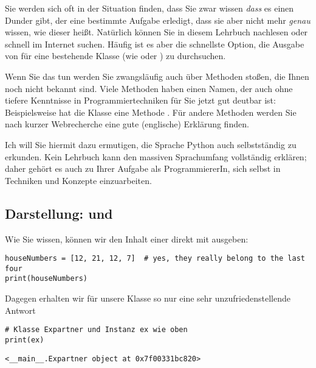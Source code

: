 \begin{hintbox}
Sie werden sich oft in der Situation finden, dass Sie zwar wissen \emph{dass} es einen Dunder gibt, der eine bestimmte Aufgabe erledigt, dass sie aber nicht mehr \emph{genau} wissen, wie dieser heißt. Natürlich können Sie in diesem Lehrbuch nachlesen oder schnell im Internet suchen. Häufig ist es aber die schnellste Option, die Ausgabe von  für eine bestehende Klasse (wie  oder ) zu durchsuchen.

Wenn Sie das tun werden Sie zwangsläufig auch über Methoden stoßen, die Ihnen noch nicht bekannt sind. Viele Methoden haben einen Namen, der auch ohne tiefere Kenntnisse in Programmiertechniken für Sie jetzt gut deutbar ist: Beispielsweise hat die Klasse  eine Methode . Für andere Methoden werden Sie nach kurzer Webrecherche eine gute (\idR englische) Erklärung finden.

Ich will Sie hiermit dazu ermutigen, die Sprache Python auch selbstständig zu erkunden. Kein Lehrbuch kann den massiven Sprachumfang vollständig erklären; daher gehört es auch zu Ihrer Aufgabe als ProgrammiererIn, sich selbst in Techniken und Konzepte einzuarbeiten.
\end{hintbox}

\subsection{Darstellung:  und }
Wie Sie wissen, können wir den Inhalt einer  direkt mit  ausgeben:
\begin{codebox}
\begin{verbatim}
houseNumbers = [12, 21, 12, 7]  # yes, they really belong to the last four
print(houseNumbers)
\end{verbatim}
\end{codebox}
\begin{cmdbox}
\end{cmdbox}

Dagegen erhalten wir für unsere Klasse so nur eine sehr unzufriedenstellende Antwort
\begin{codebox}
\begin{verbatim}
# Klasse Expartner und Instanz ex wie oben
print(ex)
\end{verbatim}
\end{codebox}
\begin{cmdbox}
\begin{verbatim}
<__main__.Expartner object at 0x7f00331bc820>
\end{verbatim}
\end{cmdbox}

